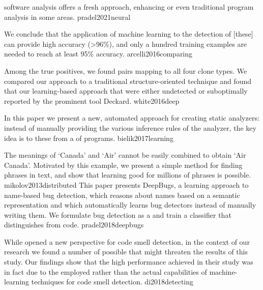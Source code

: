 \documentclass{article}
\begin{document}


  { software analysis offers a fresh approach, enhancing or even  traditional program analysis in some areas.}
  {pradel2021neural}


  {We conclude that the application of machine learning to the detection of [these]  can provide high accuracy (>96\%), and only a hundred training examples are needed to reach at least 95\% accuracy.}
  {arcelli2016comparing}

  {Among the true positives, we found pairs mapping to all four clone types. We compared our approach to a traditional structure-oriented technique and found that our learning-based approach  that were either undetected or suboptimally reported by the prominent tool Deckard.}
  {white2016deep}

  {In this paper we present a new, automated approach for creating static analyzers: instead of manually providing the various inference rules of the analyzer, the key idea is to  these  from a  of programs.}
  {bielik2017learning}

  {The meanings of `Canada' and `Air' cannot be easily combined to obtain `Air Canada'. Motivated by this example, we present a simple method for finding phrases in text, and show that learning good  for millions of phrases is possible.}
  {mikolov2013distributed}
  {This paper presents DeepBugs, a learning approach to name-based bug detection, which reasons about names based on a semantic representation and which automatically learns bug detectors instead of manually writing them. We formulate bug detection as a  and train a classifier that distinguishes  from  code.}
  {pradel2018deepbugs}

  {While \citet{arcelli2016comparing} opened a new perspective for code smell detection, in the context of our research we found a number of possible  that might threaten the results of this study. Our findings show that the high performance achieved in their study was in fact due to the  employed rather than the actual capabilities of machine-learning techniques for code smell detection.}
  {di2018detecting}
\end{document}
